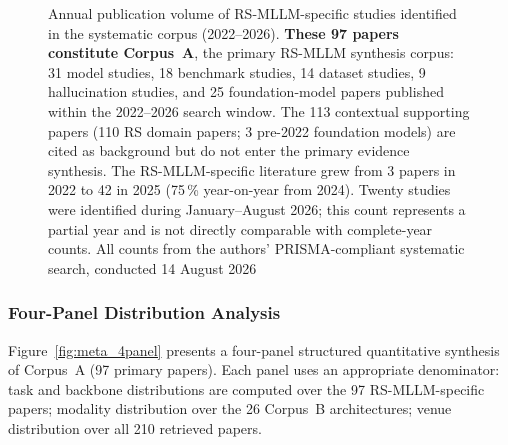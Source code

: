 \begin{figure}[h]
\caption{Annual publication volume of RS-MLLM-specific studies identified in
the systematic corpus (2022--2026). \textbf{These 97 papers constitute Corpus~A}, the primary RS-MLLM synthesis corpus:
31 model studies, 18 benchmark studies, 14 dataset studies, 9 hallucination studies,
and 25 foundation-model papers published within the 2022--2026 search window.
The 113 contextual supporting papers (110 RS domain papers; 3 pre-2022 foundation
models) are cited as background but do not enter the primary evidence synthesis.
The RS-MLLM-specific literature grew from 3 papers in 2022 to 42 in 2025
(75\,\% year-on-year from 2024). Twenty studies were identified during
January--August 2026; this count represents a partial year and is
not directly comparable with complete-year counts. All counts from the
authors' PRISMA-compliant systematic search, conducted 14 August 2026}\label{fig:pub_trend}
\end{figure}

\subsubsection{Four-Panel Distribution Analysis}\label{sec8:fourpanel}

Figure~\ref{fig:meta_4panel} presents a four-panel structured quantitative synthesis
of Corpus~A (97 primary papers). Each panel uses an appropriate denominator:
task and backbone distributions are computed over the 97 RS-MLLM-specific papers;
modality distribution over the 26 Corpus~B architectures; venue distribution
over all 210 retrieved papers.

